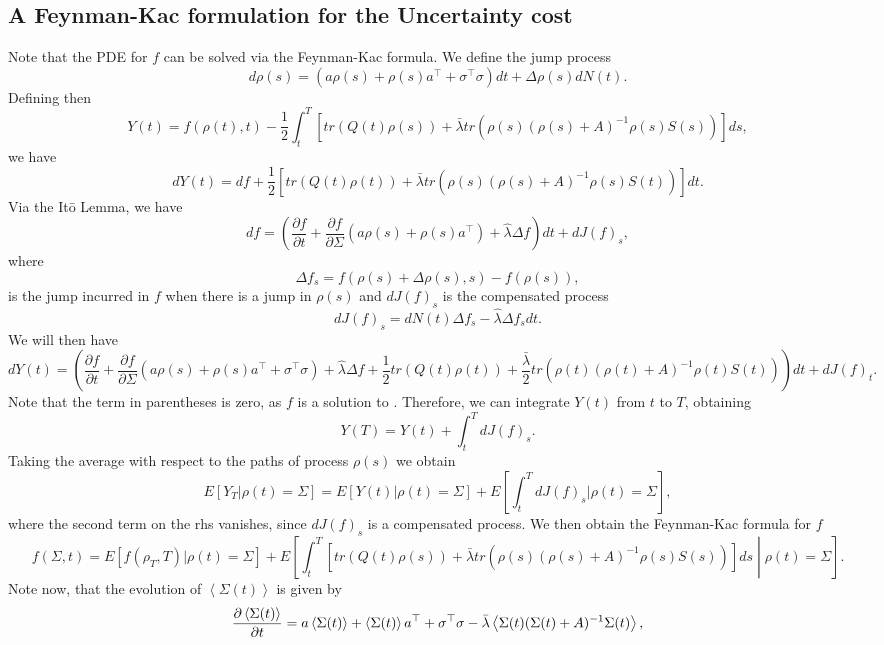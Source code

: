 \subsection{A Feynman-Kac formulation for the Uncertainty cost}

Note that the PDE for $f$ can be solved via the Feynman-Kac formula. We define the jump process
\[
d\rho(s) = (a\rho(s) + \rho(s) a^\top  + \sigma^\top \sigma) dt + \Delta \rho(s) dN(t).
\]
Defining then
\[
Y(t) = f(\rho(t),t) - \frac{1}{2} \int_t^T \left[tr\left(Q(t)\rho(s)\right)+ \bar{\lambda} tr \left(\rho(s)(\rho(s)+A)^{-1}\rho(s) S(s)\right)\right]ds,
\]
we have
\[
dY(t) = df + \frac{1}{2}\left[tr\left(Q(t)\rho(t)\right)+ \bar{\lambda} tr \left(\rho(s)(\rho(s)+A)^{-1}\rho(s) S(t)\right)\right]dt.
\]
Via the It\=o Lemma, we have
\[
df =\left(\frac{\partial f}{\partial t} + \frac{\partial f}{\partial \Sigma} (a \rho(s) + \rho(s) a^\top) + \hat{\lambda} \Delta f \right) dt+ d J(f)_s,
\]
where 
\[
\Delta f_s = f(\rho(s) + \Delta \rho(s),s) - f(\rho(s)),
\]
is the jump incurred in $f$ when there is a jump in $\rho(s)$ and $dJ(f)_s$ is the compensated process
\[
dJ(f)_s = dN(t) \Delta f_s - \hat{\lambda} \Delta f_s dt.
\]
We will then have
\[
dY(t) = \left(\frac{\partial f}{\partial t} + \frac{\partial f}{\partial \Sigma} (a \rho(s) + \rho(s) a^\top+\sigma^\top \sigma) + \hat{\lambda} \Delta f + \frac{1}{2}tr\left(Q(t)\rho(t)\right)+ \frac{\bar{\lambda}}{2} tr \left(\rho(t)(\rho(t)+A)^{-1}\rho(t) S(t)\right)\right)dt + dJ(f)_t.
\]
Note that the term in parentheses is zero, as $f$ is a solution to . Therefore, we can integrate $Y(t)$ from $t$ to $T$, obtaining
\[
Y(T) = Y(t) + \int_t^T dJ(f)_s.
\]
Taking the average with respect to the paths of process $\rho(s)$ we obtain
\[
E\left[Y_T|\rho(t)=\Sigma\right]=E\left[Y(t)|\rho(t)=\Sigma\right] + E\left[\int_t^T dJ(f)_s|\rho(t)=\Sigma\right],
\]
where the second term on the rhs vanishes, since $dJ(f)_s$ is a compensated process. We then obtain the Feynman-Kac formula for $f$
\begin{equation}
f(\Sigma,t) =E[f(\rho_T,T)|\rho(t)=\Sigma] + E\left[\int_t^T\left[tr\left(Q(t)\rho(s)\right)+ \bar{\lambda} tr \left(\rho(s)(\rho(s)+A)^{-1}\rho(s) S(s) \right)\right]ds \middle| \rho(t)=\Sigma\right].
\end{equation}
Note now, that the evolution of $\left<\Sigma(t)\right>$ is given by
\[
\frac{\partial \left<\Sigma(t)\right>}{\partial t} = a \left<\Sigma(t)\right> + \left<\Sigma(t)\right> a^\top + \sigma^\top\sigma- \bar{\lambda}\left< \Sigma(t)(\Sigma(t) + A)^{-1} \Sigma(t)\right>,
\]
